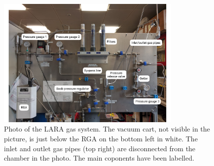 \documentclass[a4paper,11pt]{article}
\begin{document}
\begin{figure}[tbh]
	\begin{center}
	\includegraphics[width=0.8\textwidth, trim={0cm 0cm cm 3cm}, clip=true]{figures/LARA_labels.pdf}		
	\caption{Photo of the LARA gas system. The vacuum cart, not visible in the picture, is just below the RGA on the bottom left in white. The inlet and outlet gas pipes (top right) are disconnected from the chamber in the photo. The main coponents have been labelled.}
	\label{fig:LARA_gas_system}
	\end{center}
\end{figure}

\end{document}
